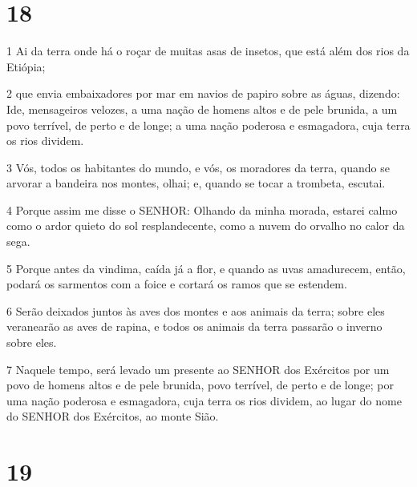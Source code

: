 \chapter{18}

\par 1 Ai da terra onde há o roçar de muitas asas de insetos, que está além dos rios da Etiópia;
\par 2 que envia embaixadores por mar em navios de papiro sobre as águas, dizendo: Ide, mensageiros velozes, a uma nação de homens altos e de pele brunida, a um povo terrível, de perto e de longe; a uma nação poderosa e esmagadora, cuja terra os rios dividem.
\par 3 Vós, todos os habitantes do mundo, e vós, os moradores da terra, quando se arvorar a bandeira nos montes, olhai; e, quando se tocar a trombeta, escutai.
\par 4 Porque assim me disse o SENHOR: Olhando da minha morada, estarei calmo como o ardor quieto do sol resplandecente, como a nuvem do orvalho no calor da sega.
\par 5 Porque antes da vindima, caída já a flor, e quando as uvas amadurecem, então, podará os sarmentos com a foice e cortará os ramos que se estendem.
\par 6 Serão deixados juntos às aves dos montes e aos animais da terra; sobre eles veranearão as aves de rapina, e todos os animais da terra passarão o inverno sobre eles.
\par 7 Naquele tempo, será levado um presente ao SENHOR dos Exércitos por um povo de homens altos e de pele brunida, povo terrível, de perto e de longe; por uma nação poderosa e esmagadora, cuja terra os rios dividem, ao lugar do nome do SENHOR dos Exércitos, ao monte Sião.

\chapter{19}

